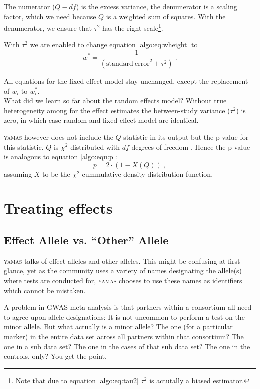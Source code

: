 The numerator ($Q - df$) is the excess variance, the denumerator is a scaling factor, which we need because $Q$ is a weighted sum of squares. With the denumerator, we ensure that $\tau^2$ has the right scale\footnote{Note that due to equation \ref{algo:eq:tau2} $\tau^2$ is actutally a biased estimator.}.

With $\tau^2$ we are enabled to change equation \ref{algo:eq:wheight} to
\begin{equation}
 w^* = \frac{1}{\left( \mathrm{standard~error}^2 + \tau^2 \right)}~.
\end{equation}

All equations for the fixed effect model stay unchanged, except the replacement of $w_i$ to $w_i^*$.\\

What did we learn so far about the random effects model? Without true heterogeneity among for the effect estimates the between-study variance ($\tau^2$) is zero, in which case random and fixed effect model are identical.

\textsc{yamas} however does not include the $Q$ statistic in its output but the p-value for this statistic. $Q$ is $\chi^2$ distributed with $df$ degrees of freedom \citep{Gavaghan2000}.
Hence the p-value is analogous to equation \ref{algo:equ:p}:
\begin{equation}
 p = 2 \cdot \left(1 - X(Q) \right)~,
\end{equation}
assuming $X$ to be the $\chi^2$ cummulative density distribution function.

\section{Treating effects}

\subsection{Effect Allele vs. ``Other'' Allele}
\label{algo:alleles}

\textsc{yamas} talks of effect alleles and other alleles. This might be confusing at first glance, yet as the community uses a variety of names designating the allele(s) where tests are conducted for, \textsc{yamas} chooses to use these names as identifiers which cannot be mistaken.

A problem in GWAS meta-analysis is that partners within a consortium all need to agree upon allele designations: It is not uncommon to perform a test on the minor allele. But what actually is a minor allele? The one (for a particular marker) in the entire data set across all partners within that consortium? The one in a sub data set? The one in the cases of that sub data set? The one in the controls, only? You get the point.

